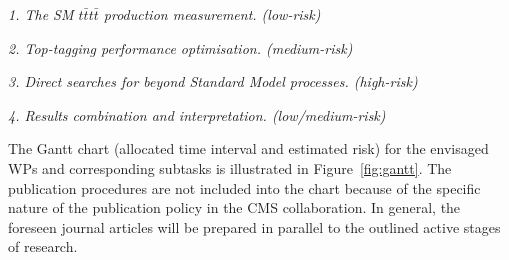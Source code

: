%
%
%

\noindent\textit{1. The SM $t\bar{t}t\bar{t}$ production measurement. (low-risk)}\\

\newline


\noindent\textit{2. Top-tagging performance optimisation. (medium-risk)}\\

\newline


\noindent\textit{3. Direct searches for beyond Standard Model processes. (high-risk)}\\

\newline


\textit{4. Results combination and interpretation. (low/medium-risk)}\\

\newline

The Gantt chart (allocated time interval and estimated risk) for the envisaged WPs and corresponding subtasks is illustrated in Figure~\ref{fig:gantt}. The publication procedures are not included into the chart because of the specific nature of the publication policy in the CMS collaboration. In general, the foreseen journal articles will be prepared in parallel to the outlined active stages of research.
